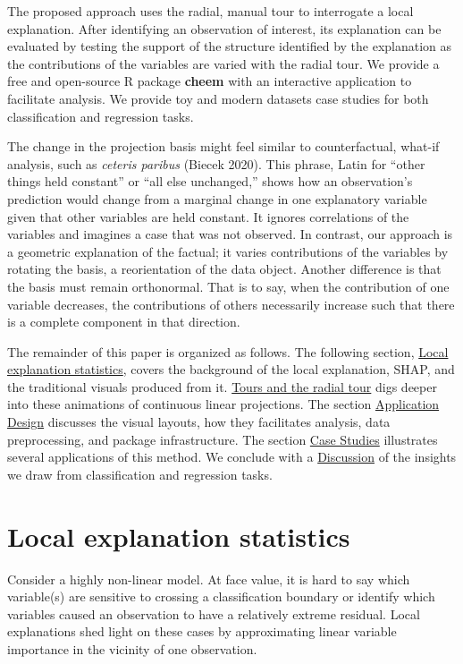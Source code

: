 \documentclass[
  article]{article}
\begin{document}
The proposed approach uses the radial, manual tour to interrogate a local explanation. After identifying an observation of interest, its explanation can be evaluated by testing the support of the structure identified by the explanation as the contributions of the variables are varied with the radial tour. We provide a free and open-source R package \textbf{cheem} with an interactive application to facilitate analysis. We provide toy and modern datasets case studies for both classification and regression tasks.

The change in the projection basis might feel similar to counterfactual, what-if analysis, such as \emph{ceteris paribus} (Biecek 2020). This phrase, Latin for ``other things held constant'' or ``all else unchanged,'' shows how an observation's prediction would change from a marginal change in one explanatory variable given that other variables are held constant. It ignores correlations of the variables and imagines a case that was not observed. In contrast, our approach is a geometric explanation of the factual; it varies contributions of the variables by rotating the basis, a reorientation of the data object. Another difference is that the basis must remain orthonormal. That is to say, when the contribution of one variable decreases, the contributions of others necessarily increase such that there is a complete component in that direction.

The remainder of this paper is organized as follows. The following section, \protect\hyperlink{sec:explanations}{Local explanation statistics}, covers the background of the local explanation, SHAP, and the traditional visuals produced from it. \protect\hyperlink{sec:tour}{Tours and the radial tour} digs deeper into these animations of continuous linear projections. The section \protect\hyperlink{sec:applicationdesign}{Application Design} discusses the visual layouts, how they facilitates analysis, data preprocessing, and package infrastructure. The section \protect\hyperlink{sec:casestudies}{Case Studies} illustrates several applications of this method. We conclude with a \protect\hyperlink{sec:cheemdiscussion}{Discussion} of the insights we draw from classification and regression tasks.

\hypertarget{sec:explanations}{%
\section{Local explanation statistics}\label{sec:explanations}}

Consider a highly non-linear model. At face value, it is hard to say which variable(s) are sensitive to crossing a classification boundary or identify which variables caused an observation to have a relatively extreme residual. Local explanations shed light on these cases by approximating linear variable importance in the vicinity of one observation.
\end{document}
